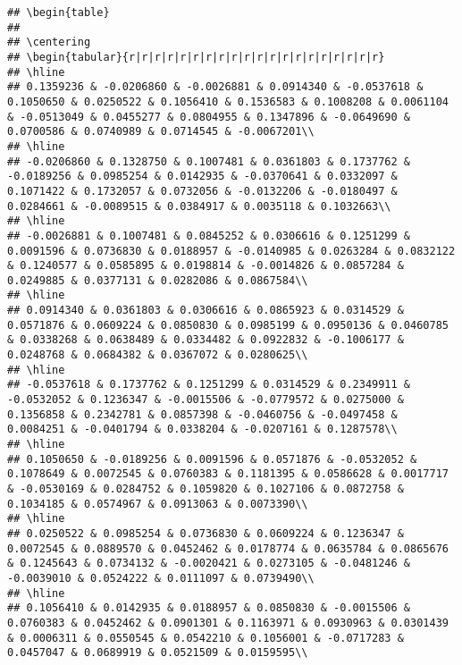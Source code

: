 \documentclass[]{article}
\begin{document}
\begin{verbatim}
## \begin{table}
## 
## \centering
## \begin{tabular}{r|r|r|r|r|r|r|r|r|r|r|r|r|r|r|r|r|r|r|r}
## \hline
## 0.1359236 & -0.0206860 & -0.0026881 & 0.0914340 & -0.0537618 & 0.1050650 & 0.0250522 & 0.1056410 & 0.1536583 & 0.1008208 & 0.0061104 & -0.0513049 & 0.0455277 & 0.0804955 & 0.1347896 & -0.0649690 & 0.0700586 & 0.0740989 & 0.0714545 & -0.0067201\\
## \hline
## -0.0206860 & 0.1328750 & 0.1007481 & 0.0361803 & 0.1737762 & -0.0189256 & 0.0985254 & 0.0142935 & -0.0370641 & 0.0332097 & 0.1071422 & 0.1732057 & 0.0732056 & -0.0132206 & -0.0180497 & 0.0284661 & -0.0089515 & 0.0384917 & 0.0035118 & 0.1032663\\
## \hline
## -0.0026881 & 0.1007481 & 0.0845252 & 0.0306616 & 0.1251299 & 0.0091596 & 0.0736830 & 0.0188957 & -0.0140985 & 0.0263284 & 0.0832122 & 0.1240577 & 0.0585895 & 0.0198814 & -0.0014826 & 0.0857284 & 0.0249885 & 0.0377131 & 0.0282086 & 0.0867584\\
## \hline
## 0.0914340 & 0.0361803 & 0.0306616 & 0.0865923 & 0.0314529 & 0.0571876 & 0.0609224 & 0.0850830 & 0.0985199 & 0.0950136 & 0.0460785 & 0.0338268 & 0.0638489 & 0.0334482 & 0.0922832 & -0.1006177 & 0.0248768 & 0.0684382 & 0.0367072 & 0.0280625\\
## \hline
## -0.0537618 & 0.1737762 & 0.1251299 & 0.0314529 & 0.2349911 & -0.0532052 & 0.1236347 & -0.0015506 & -0.0779572 & 0.0275000 & 0.1356858 & 0.2342781 & 0.0857398 & -0.0460756 & -0.0497458 & 0.0084251 & -0.0401794 & 0.0338204 & -0.0207161 & 0.1287578\\
## \hline
## 0.1050650 & -0.0189256 & 0.0091596 & 0.0571876 & -0.0532052 & 0.1078649 & 0.0072545 & 0.0760383 & 0.1181395 & 0.0586628 & 0.0017717 & -0.0530169 & 0.0284752 & 0.1059820 & 0.1027106 & 0.0872758 & 0.1034185 & 0.0574967 & 0.0913063 & 0.0073390\\
## \hline
## 0.0250522 & 0.0985254 & 0.0736830 & 0.0609224 & 0.1236347 & 0.0072545 & 0.0889570 & 0.0452462 & 0.0178774 & 0.0635784 & 0.0865676 & 0.1245643 & 0.0734132 & -0.0020421 & 0.0273105 & -0.0481246 & -0.0039010 & 0.0524222 & 0.0111097 & 0.0739490\\
## \hline
## 0.1056410 & 0.0142935 & 0.0188957 & 0.0850830 & -0.0015506 & 0.0760383 & 0.0452462 & 0.0901301 & 0.1163971 & 0.0930963 & 0.0301439 & 0.0006311 & 0.0550545 & 0.0542210 & 0.1056001 & -0.0717283 & 0.0457047 & 0.0689919 & 0.0521509 & 0.0159595\\

\end{verbatim}
\end{document}
